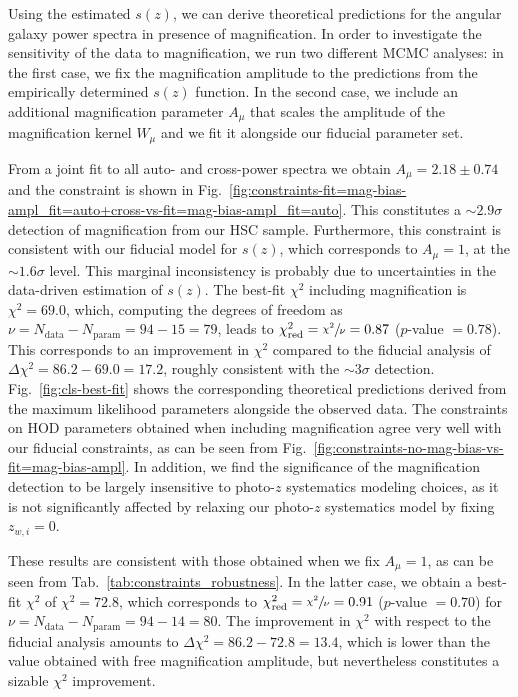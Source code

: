 \documentclass[a4paper,11pt]{article}
\begin{document}
    Using the estimated $s(z)$, we can derive theoretical predictions for the angular galaxy power spectra in presence of magnification. In order to investigate the sensitivity of the data to magnification, we run two different MCMC analyses: in the first case, we fix the magnification amplitude to the predictions from the empirically determined $s(z)$ function. In the second case, we include an additional magnification parameter $A_{\mu}$ that scales the amplitude of the magnification kernel $W_{\mu}$ and we fit it alongside our fiducial parameter set.

    From a joint fit to all auto- and cross-power spectra we obtain $A_{\mu} = 2.18 \pm 0.74$ and the constraint is shown in Fig.~\ref{fig:constraints-fit=mag-bias-ampl_fit=auto+cross-vs-fit=mag-bias-ampl_fit=auto}. This constitutes a $\sim 2.9 \sigma$ detection of magnification from our HSC sample. Furthermore, this constraint is consistent with our fiducial model for $s(z)$, which corresponds to $A_{\mu} = 1$, at the $\sim 1.6 \sigma$ level. This marginal inconsistency is probably due to uncertainties in the data-driven estimation of $s(z)$. The best-fit $\chi^{2}$ including magnification is $\chi^{2} = 69.0$, which, computing the degrees of freedom as $\nu = N_{\mathrm{data}} - N_{\mathrm{param}} = 94 - 15 = 79$, leads to $\chi^{2}_{\mathrm{red}} = \sfrac{\chi^{2}}{\nu} = 0.87$ ($p$-value $= 0.78$). This corresponds to an improvement in $\chi^{2}$ compared to the fiducial analysis of $\Delta \chi^{2} = 86.2 - 69.0 = 17.2$, roughly consistent with the $\sim 3 \sigma$ detection. Fig.~\ref{fig:cls-best-fit} shows the corresponding theoretical predictions derived from the maximum likelihood parameters alongside the observed data. The constraints on HOD parameters obtained when including magnification agree very well with our fiducial constraints, as can be seen from Fig.~\ref{fig:constraints-no-mag-bias-vs-fit=mag-bias-ampl}. In addition, we find the significance of the magnification detection to be largely insensitive to photo-$z$ systematics modeling choices, as it is not significantly affected by relaxing our photo-$z$ systematics model by fixing $z_{w, i} = 0$. 

    These results are consistent with those obtained when we fix $A_{\mu} = 1$, as can be seen from Tab.~\ref{tab:constraints_robustness}. In the latter case, we obtain a best-fit $\chi^{2}$ of $\chi^{2} = 72.8$, which corresponds to $\chi^{2}_{\mathrm{red}} = \sfrac{\chi^{2}}{\nu} = 0.91$ ($p$-value $= 0.70$) for $\nu = N_{\mathrm{data}} - N_{\mathrm{param}} = 94 - 14 = 80$. The improvement in $\chi^{2}$ with respect to the fiducial analysis amounts to $\Delta \chi^{2} = 86.2 - 72.8 = 13.4$, which is lower than the value obtained with free magnification amplitude, but nevertheless constitutes a sizable $\chi^{2}$ improvement.
\end{document}
